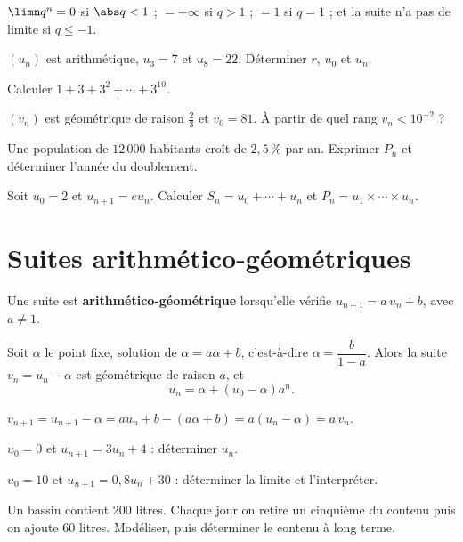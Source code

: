\begin{propriete}
$\limn q^{n} = 0$ si $\abs q<1$ ; $=+\infty$ si $q>1$ ; $=1$ si $q = 1$ ; et
la suite n'a pas de limite si $q \leq -1$.
\end{propriete}

\begin{entrainement}
\exo[\niveau{1}] $(u_{n})$ est arithmétique, $u_{3} = 7$ et $u_{8} = 22$.
Déterminer $r$, $u_{0}$ et $u_{n}$.

\exo[\niveau{1}] Calculer $1+3+3^{2}+\cdots+3^{10}$.

\exo[\niveau{2}] $(v_{n})$ est géométrique de raison $\frac23$ et
$v_{0} = 81$. À partir de quel rang $v_{n}<10^{-2}$ ?

\exo[\niveau{2}] Une population de $12\,000$ habitants croît de $2{,}5\,\%$
par an. Exprimer $P_{n}$ et déterminer l'année du doublement.

\exo[\niveau{3}] Soit $u_{0} = 2$ et $u_{n+1} = eu_{n}$. Calculer
$S_{n} = u_{0}+\cdots+u_{n}$ et $P_{n} = u_{1}\times\cdots\times u_{n}$.
\end{entrainement}

\section{Suites arithmético-géométriques}

\begin{definition}
Une suite est \textbf{arithmético-géométrique} lorsqu'elle vérifie
$u_{n+1} = a\,u_{n}+b$, avec $a \neq 1$.
\end{definition}

\begin{propriete}[réduction]
Soit $\alpha$ le point fixe, solution de $\alpha = a\alpha+b$, c'est-à-dire
$\alpha = \dfrac{b}{1-a}$. Alors la suite $v_{n} = u_{n}-\alpha$ est
géométrique de raison $a$, et
\[
  u_{n} = \alpha + \left(u_{0}-\alpha\right)a^{n}.
\]
\end{propriete}

\begin{demonstration}
$v_{n+1} = u_{n+1}-\alpha = au_{n}+b-(a\alpha+b) = a\left(u_{n}-\alpha\right)
= a\,v_{n}$.
\end{demonstration}

\begin{entrainement}
\exo[\niveau{1}] $u_{0} = 0$ et $u_{n+1} = 3u_{n}+4$ : déterminer $u_{n}$.

\exo[\niveau{2}] $u_{0} = 10$ et $u_{n+1} = 0{,}8u_{n}+30$ : déterminer la
limite et l'interpréter.

\exo[\niveau{3}] Un bassin contient $200$ litres. Chaque jour on retire un
cinquième du contenu puis on ajoute $60$ litres. Modéliser, puis déterminer
le contenu à long terme.
\end{entrainement}

